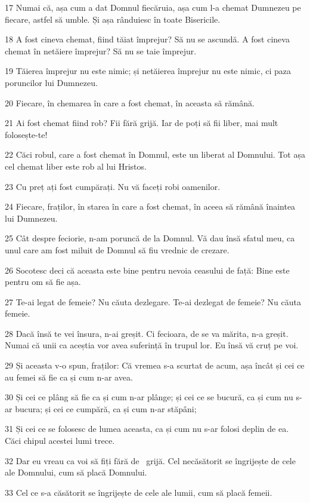 \par 17 Numai că, așa cum a dat Domnul fiecăruia, așa cum l-a chemat Dumnezeu pe fiecare, astfel să umble. Și așa rânduiesc în toate Bisericile.
\par 18 A fost cineva chemat, fiind tăiat împrejur? Să nu se ascundă. A fost cineva chemat în netăiere împrejur? Să nu se taie împrejur.
\par 19 Tăierea împrejur nu este nimic; și netăierea împrejur nu este nimic, ci paza poruncilor lui Dumnezeu.
\par 20 Fiecare, în chemarea în care a fost chemat, în aceasta să rămână.
\par 21 Ai fost chemat fiind rob? Fii fără grijă. Iar de poți să fii liber, mai mult folosește-te!
\par 22 Căci robul, care a fost chemat în Domnul, este un liberat al Domnului. Tot așa cel chemat liber este rob al lui Hristos.
\par 23 Cu preț ați fost cumpărați. Nu vă faceți robi oamenilor.
\par 24 Fiecare, fraților, în starea în care a fost chemat, în aceea să rămână înaintea lui Dumnezeu.
\par 25 Cât despre feciorie, n-am poruncă de la Domnul. Vă dau însă sfatul meu, ca unul care am fost miluit de Domnul să fiu vrednic de crezare.
\par 26 Socotesc deci că aceasta este bine pentru nevoia ceasului de față: Bine este pentru om să fie așa.
\par 27 Te-ai legat de femeie? Nu căuta dezlegare. Te-ai dezlegat de femeie? Nu căuta femeie.
\par 28 Dacă însă te vei însura, n-ai greșit. Ci fecioara, de se va mărita, n-a greșit. Numai că unii ca aceștia vor avea suferință în trupul lor. Eu însă vă cruț pe voi.
\par 29 Și aceasta v-o spun, fraților: Că vremea s-a scurtat de acum, așa încât și cei ce au femei să fie ca și cum n-ar avea.
\par 30 Și cei ce plâng să fie ca și cum n-ar plânge; și cei ce se bucură, ca și cum nu s-ar bucura; și cei ce cumpără, ca și cum n-ar stăpâni;
\par 31 Și cei ce se folosesc de lumea aceasta, ca și cum nu s-ar folosi deplin de ea. Căci chipul acestei lumi trece.
\par 32 Dar eu vreau ca voi să fiți fără de  grijă. Cel necăsătorit se îngrijește de cele ale Domnului, cum să placă Domnului.
\par 33 Cel ce s-a căsătorit se îngrijește de cele ale lumii, cum să placă femeii.
